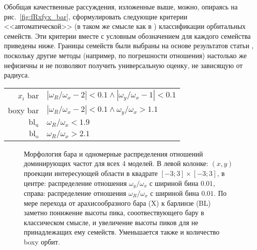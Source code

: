 \documentclass[tikz]{trlnotes}
\begin{document}
Обобщая качественные рассуждения, изложенные выше, можно, опираясь на рис.~\ref{fig:fRxfyx_bar}, сформулировать следующие критерии <<автоматической>> (в
таком же смысле как в \cite{valluri2016}) классификации орбитальных семейств. Эти критерии вместе с условным обозначением для каждого семейства приведены ниже.
Границы семейств были выбраны на основе результатов статьи \citet{portail2015}, поскольку другие методы (например, по погрешности отношения) настолько же нефизичны и не позволяют получить универсальную оценку, не зависящую от радиуса.
\begin{table}[hb]
  \begin{tabular}{rl}
    $x_i$ bar & $|ω_R/ω_x - 2| < 0.1 \land |ω_y/ω_x - 1| < 0.1$ \\
    boxy bar  & $|ω_R/ω_x - 2| < 0.1 \land  ω_y/ω_x > 1.1$ \\
    $\text{bl}_\text{u}$  & $ω_R/ω_x < 1.9$ \\
    $\text{bl}_\text{o}$  & $ω_R/ω_x > 2.1$ \\
  \end{tabular}
\end{table}

\begin{figure}[htpb]
\centering
{}  
\caption{Морфология бара и одномерные распределения отношений доминирующих частот для всех 4 моделей. В левой колонке:
  $(x,y)$ проекции интересующей области в квадрате $[-3;3]\times[-3;3]$, в центре: распределение отношения $ω_y/ω_x$ с шириной бина $0.01$, справа: распределение отношения $ω_R/ω_x$ с шириной бина $0.01$. По мере перехода от арахисообразного бара (X) к барлинзе (BL) заметно понижение высоты пика, сооотвествующего бару в классическом
  смысле, и увеличение высоты пиков для не принадлежащих ему семейств. Уменьшается также и количество boxy орбит.}
\label{fig:modelcomp1dist}
\end{figure}
\end{document}
